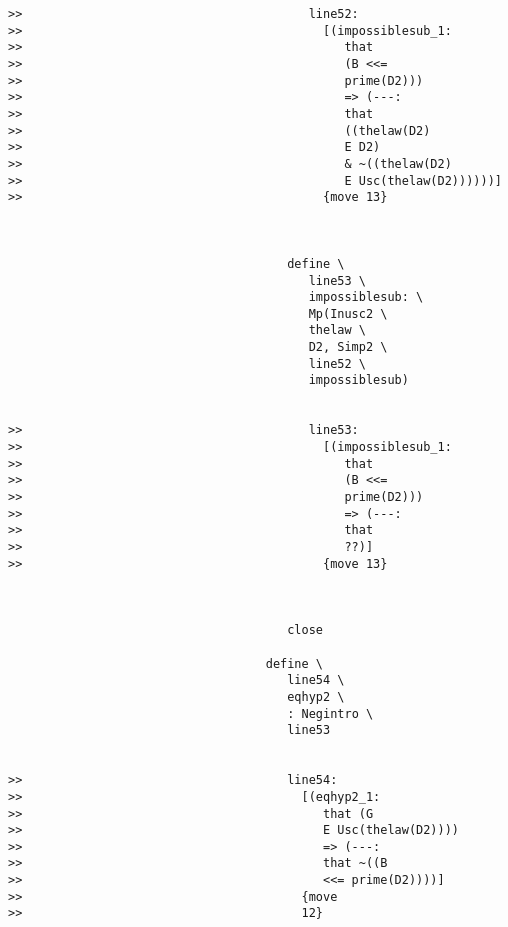 \documentclass[12pt]{article}
\begin{document}
\begin{verbatim}
>>                                        line52:
>>                                          [(impossiblesub_1:
>>                                             that
>>                                             (B <<=
>>                                             prime(D2)))
>>                                             => (---:
>>                                             that
>>                                             ((thelaw(D2)
>>                                             E D2)
>>                                             & ~((thelaw(D2)
>>                                             E Usc(thelaw(D2))))))]
>>                                          {move 13}



                                       define \
                                          line53 \
                                          impossiblesub: \
                                          Mp(Inusc2 \
                                          thelaw \
                                          D2, Simp2 \
                                          line52 \
                                          impossiblesub)


>>                                        line53:
>>                                          [(impossiblesub_1:
>>                                             that
>>                                             (B <<=
>>                                             prime(D2)))
>>                                             => (---:
>>                                             that
>>                                             ??)]
>>                                          {move 13}



                                       close

                                    define \
                                       line54 \
                                       eqhyp2 \
                                       : Negintro \
                                       line53


>>                                     line54:
>>                                       [(eqhyp2_1:
>>                                          that (G
>>                                          E Usc(thelaw(D2))))
>>                                          => (---:
>>                                          that ~((B
>>                                          <<= prime(D2))))]
>>                                       {move
>>                                       12}




\end{verbatim}
\end{document}
